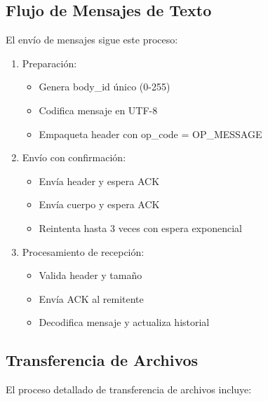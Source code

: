 \documentclass[12pt]{article}
\begin{document}
\subsection{Flujo de Mensajes de Texto}
El envío de mensajes sigue este proceso:

\begin{enumerate}
    \item Preparación:
    \begin{itemize}
        \item Genera body\_id único (0-255)
        \item Codifica mensaje en UTF-8
        \item Empaqueta header con op\_code = OP\_MESSAGE
    \end{itemize}
    \item Envío con confirmación:
    \begin{itemize}
        \item Envía header y espera ACK
        \item Envía cuerpo y espera ACK
        \item Reintenta hasta 3 veces con espera exponencial
    \end{itemize}
    \item Procesamiento de recepción:
    \begin{itemize}
        \item Valida header y tamaño
        \item Envía ACK al remitente
        \item Decodifica mensaje y actualiza historial
    \end{itemize}
\end{enumerate}

\subsection{Transferencia de Archivos}
El proceso detallado de transferencia de archivos incluye:
\end{document}
